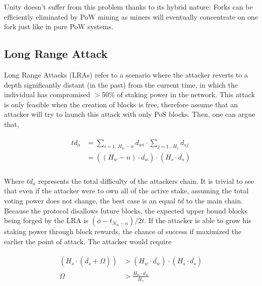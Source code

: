 \documentclass[a4paper]{article}
\begin{document}
Unity doesn't suffer from this problem thanks to its hybrid nature: Forks can be efficiently eliminated by PoW mining as miners will eventually concentrate on one fork just like in pure PoW systems.


\subsection{Long Range Attack}
\label{sec:lra}

Long Range Attacks (LRAs) refer to a scenario where the attacker reverts to a depth significantly distant (in the past) from the current time, in which the individual has compromised $>50\%$ of staking power in the network. This attack is only feasible when the creation of blocks is free, therefore assume that an attacker will try to launch this attack with only PoS blocks. Then, one can argue that,

\begin{equation}
\begin{split}
\begin{aligned}
td_{a} &= \sum_{i = 1..H_w - n}{d_{wi}} \cdot \sum_{j = 1...H_s}{d_{sj}} \\
&= ((H_w - n) \cdot \overline{d_{w}}) \cdot (H_s \cdot \overline{d_{s}}) \\
\end{aligned}
\end{split}
\end{equation}

Where $td_{a}$ represents the total difficulty of the attackers chain. It is trivial to see that even if the attacker were to own all of the active stake, assuming the total voting power does not change, the best case is an equal $td$ to the main chain. Because the protocol disallows future blocks, the expected upper bound blocks being forged by the LRA is $(\phi - t_{N_w - n}) / 2t$. If the attacker is able to grow his staking power through block rewards, the chance of success if maximized the earlier the point of attack. The attacker would require 

\begin{equation}
\label{eq:additional_power}
\begin{split}
\begin{aligned}
(H_s \cdot (\overline{d_{s}} + \Omega)) &> (H_w \cdot \overline{d_{w}}) \cdot (H_s \cdot \overline{d_{s}}) \\
\Omega &> \frac{H_w \cdot \overline{d_{w}}}{H_s}
\end{aligned}
\end{split}
\end{equation}
\end{document}

